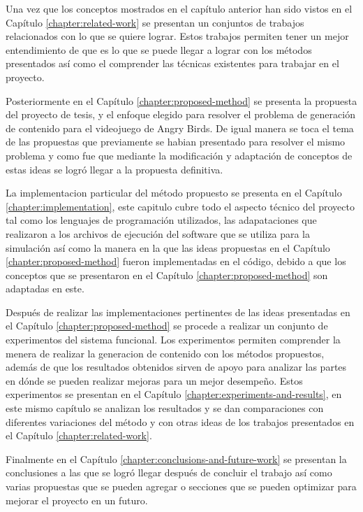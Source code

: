 Una vez que los conceptos mostrados en el capítulo anterior han sido
vistos en el Capítulo \ref{chapter:related-work} se presentan un
conjuntos de trabajos relacionados con lo que se quiere lograr. Estos trabajos
permiten tener un mejor entendimiento de que es lo que se puede llegar a lograr
con los métodos presentados así como el comprender las técnicas 
existentes para trabajar en el proyecto.

Posteriormente en el Capítulo \ref{chapter:proposed-method} se presenta la
propuesta del proyecto de tesis, y el enfoque elegido para resolver el 
problema de generación de contenido para el
videojuego de Angry Birds. De igual manera se toca el tema de las 
propuestas que previamente se habian presentado para resolver el mismo 
problema y como fue que mediante la modificación y adaptación de conceptos
de estas ideas se logró llegar a la propuesta definitiva.

La implementacion particular del método propuesto se presenta en el Capítulo
\ref{chapter:implementation}, este capitulo cubre todo el aspecto técnico del
proyecto tal como los lenguajes de programación utilizados, las adapataciones
que realizaron a los archivos de ejecución del software que se utiliza para la
simulación así como la manera en la que las ideas propuestas en el Capítulo
\ref{chapter:proposed-method} fueron implementadas en el código, debido a que
los conceptos que se presentaron en el Capítulo \ref{chapter:proposed-method}
son adaptadas en este.

Después de realizar las implementaciones pertinentes de las ideas presentadas en
el Capítulo \ref{chapter:proposed-method} se procede a realizar un conjunto de
experimentos del sistema funcional. Los experimentos permiten comprender la
menera de realizar la generacion de contenido con los métodos
propuestos, además de que los resultados obtenidos sirven de apoyo para analizar
las partes en dónde se pueden realizar mejoras para un mejor desempeño. Estos
experimentos se presentan en el Capítulo \ref{chapter:experiments-and-results},
en este mismo capítulo se analizan los resultados y se dan comparaciones con
diferentes variaciones del método y con otras ideas de los trabajos presentados
en el Capítulo \ref{chapter:related-work}.

Finalmente en el Capítulo \ref{chapter:conclusions-and-future-work} se presentan
la conclusiones a las que se logró llegar después de concluir el trabajo así
como varias propuestas que se pueden agregar o secciones que se pueden optimizar
para mejorar el proyecto en un futuro.

